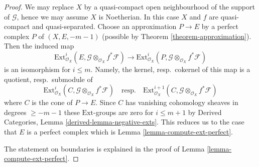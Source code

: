 \begin{proof}
We may replace $X$ by a quasi-compact open neighbourhood of
the support of $\mathcal{G}$, hence we may assume $X$ is Noetherian.
In this case $X$ and $f$ are quasi-compact and quasi-separated.
Choose an approximation $P \to E$ by a perfect complex $P$ of $(X, E, -m - 1)$
(possible by Theorem \ref{theorem-approximation}).
Then the induced map
$$
\text{Ext}^i_{\mathcal{O}_X}(E,
\mathcal{G} \otimes_{\mathcal{O}_X} f^*\mathcal{F})
\longrightarrow
\text{Ext}^i_{\mathcal{O}_X}(P,
\mathcal{G} \otimes_{\mathcal{O}_X} f^*\mathcal{F})
$$
is an isomorphism for $i \leq m$. Namely, the kernel, resp.\ cokernel of this
map is a quotient, resp.\ submodule of
$$
\text{Ext}^i_{\mathcal{O}_X}(C,
\mathcal{G} \otimes_{\mathcal{O}_X} f^*\mathcal{F})
\quad\text{resp.}\quad
\text{Ext}^{i + 1}_{\mathcal{O}_X}(C,
\mathcal{G} \otimes_{\mathcal{O}_X} f^*\mathcal{F})
$$
where $C$ is the cone of $P \to E$. Since $C$ has vanishing cohomology
sheaves in degrees $\geq -m - 1$ these $\text{Ext}$-groups are zero
for $i \leq m + 1$ by
Derived Categories, Lemma \ref{derived-lemma-negative-exts}.
This reduces us to the case that
$E$ is a perfect complex which is Lemma \ref{lemma-compute-ext-perfect}.

\medskip\noindent
The statement on boundaries is explained in the proof of
Lemma \ref{lemma-compute-ext-perfect}.
\end{proof}


















